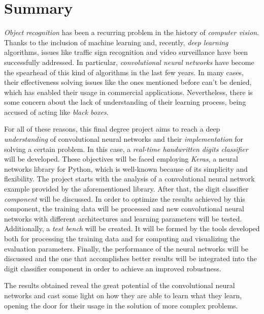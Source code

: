 \chapter*{Summary}
\emph{Object recognition} has been a recurring problem in the history of \emph{computer vision}. Thanks to the inclusion of machine learning and, recently, \emph{deep learning} algorithms, issues like traffic sign recognition and video surveillance have been successfully addressed. In particular, \emph{convolutional neural networks} have become the spearhead of this kind of algorithms in the last few years. In many cases, their effectiveness solving issues like the ones mentioned before can't be denied, which has enabled their usage in commercial applications. Nevertheless, there is some concern about the lack of understanding of their learning process, being accused of acting like \emph{black boxes}.

For all of these reasons, this final degree project aims to reach a deep \emph{understanding} of convolutional neural networks and their \emph{implementation} for solving a certain problem. In this case, a \emph{real-time handwritten digits classifier} will be developed. These objectives will be faced employing \emph{Keras}, a neural networks library for Python, which is well-known because of its simplicity and flexibility. The project starts with the analysis of a convolutional neural network example provided by the aforementioned library. After that, the digit classifier \emph{component} will be discussed. In order to optimize the results achieved by this component, the training data will be processed and new convolutional neural networks with different architectures and learning parameters will be tested. Additionally, a \emph{test bench} will be created. It will be formed by the tools developed both for processing the training data and for computing and visualizing the evaluation parameters. Finally, the performance of the neural networks will be discussed and the one that accomplishes better results will be integrated into the digit classifier component in order to achieve an improved robustness.

The results obtained reveal the great potential of the convolutional neural networks and cast some light on how they are able to learn what they learn, opening the door for their usage in the solution of more complex problems.